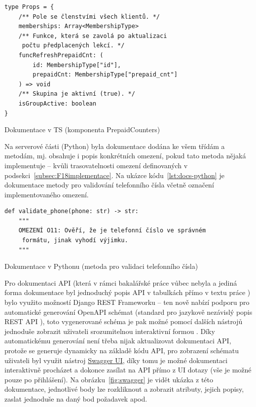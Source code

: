 \begin{listing}[ht]
	\begin{verbatim}
type Props = {
    /** Pole se členstvími všech klientů. */
    memberships: Array<MembershipType>
    /** Funkce, která se zavolá po aktualizaci
     počtu předplacených lekcí. */
    funcRefreshPrepaidCnt: (
        id: MembershipType["id"],
        prepaidCnt: MembershipType["prepaid_cnt"]
    ) => void
    /** Skupina je aktivní (true). */
    isGroupActive: boolean
}
	\end{verbatim}
	\caption{Dokumentace v TS (komponenta PrepaidCounters)}\label{lst:docs-js}
\end{listing}

Na serverové části (Python) byla dokumentace dodána ke všem třídám a metodám, mj. obsahuje i popis konkrétních omezení, pokud tato metoda nějaká implementuje -- kvůli trasovatelnosti omezení definovaných v podsekci~\ref{subsec:F18implementace}. Na ukázce kódu~\ref{lst:docs-python} je dokumentace metody pro validování telefonního čísla včetně označení implementovaného omezení.

\begin{listing}[ht]
	\begin{verbatim}
def validate_phone(phone: str) -> str:
    """
    OMEZENÍ O11: Ověří, že je telefonní číslo ve správném
     formátu, jinak vyhodí výjimku.
    """
	\end{verbatim}
	\caption{Dokumentace v Pythonu (metoda pro validaci telefonního čísla)}\label{lst:docs-python}
\end{listing}

Pro dokumentaci API (která v rámci bakalářské práce vůbec nebyla a jediná forma dokumentace byl jednoduchý popis API v tabulkách přímo v textu práce \cite{bp}) bylo využito možností Django REST Frameworku -- ten nově nabízí podporu pro automatické generování OpenAPI schémat (standard pro jazykově nezávislý popis REST API \cite{openapi}), toto vygenerované schéma je pak možné pomocí dalších nástrojů jednoduše zobrazit uživateli srozumitelnou interaktivní formou \cite{drf-openapi}. Díky automatickému generování není třeba nijak aktualizovat dokumentaci API, protože se generuje dynamicky na základě kódu API, pro zobrazení schématu uživateli byl využit nástroj \href{https://swagger.io/tools/swagger-ui/}{Swagger UI}, díky tomu je možné dokumentaci interaktivně procházet a dokonce zasílat na API přímo z UI dotazy (vše je možné pouze po přihlášení). Na obrázku~\ref{fig:swagger} je vidět ukázka z této dokumentace, jednotlivé body lze rozkliknout a zobrazit atributy, jejich popisy, zaslat jednoduše na daný bod požadavek apod.

